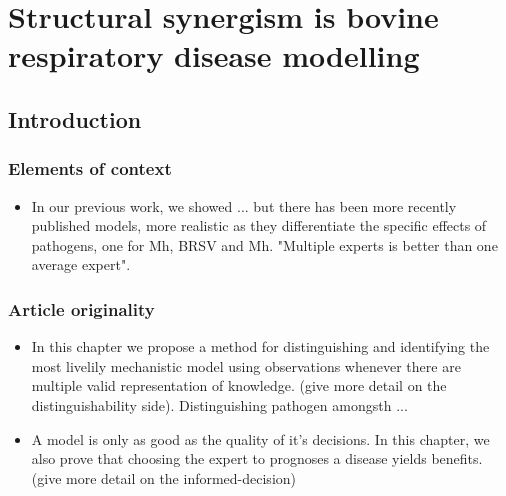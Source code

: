 
\chapter{Structural synergism is bovine respiratory disease modelling} %


\section{Introduction}
\subsection{Elements of context}

\begin{itemize}
    \item In our previous work, we showed ... but there has been more recently published models, more realistic as they differentiate the specific effects of pathogens, one for Mh, BRSV and Mh. "Multiple experts is better than one average expert". 

\end{itemize}


\subsection{Article originality}

\begin{itemize}
    \item  In this chapter we propose a method for distinguishing and identifying the most livelily mechanistic model using observations whenever there are multiple valid representation of knowledge. (give more detail on the distinguishability side). Distinguishing pathogen amongsth ...
    \item A model is only as good as the quality of it's decisions. In this chapter, we also prove that choosing the expert to prognoses a disease yields benefits. (give more detail on the informed-decision)
\end{itemize}


